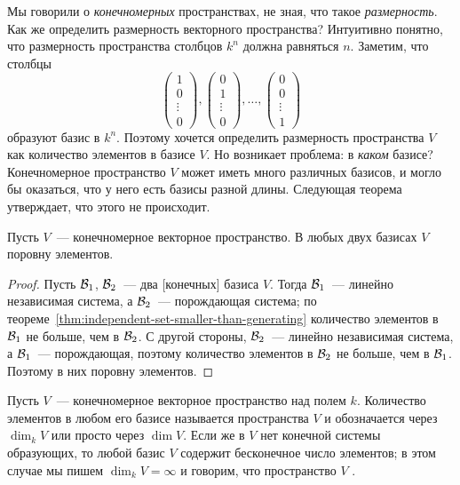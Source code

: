 Мы говорили о {\em конечномерных} пространствах, не зная, что такое
{\em размерность}. Как же определить размерность векторного пространства?
Интуитивно понятно, что размерность пространства столбцов $k^n$ должна равняться $n$.
Заметим, что столбцы
$$
\begin{pmatrix}
1 \\ 0 \\ \vdots \\ 0
\end{pmatrix},
\begin{pmatrix}
0 \\ 1 \\ \vdots \\ 0
\end{pmatrix},\dots,
\begin{pmatrix}
0 \\ 0 \\ \vdots \\ 1
\end{pmatrix}
$$
образуют базис в $k^n$. Поэтому хочется определить размерность пространства $V$
как количество элементов в базисе $V$. Но возникает проблема: в {\em каком} базисе?
Конечномерное пространство $V$ может иметь много различных базисов,
и могло бы оказаться, что у него есть базисы разной длины.
Следующая теорема утверждает, что этого не происходит.

\begin{theorem}\label{thm:bases-have-equal-cardinality}
Пусть $V$~--- конечномерное векторное пространство. В любых двух
базисах $V$ поровну элементов.
\end{theorem}
\begin{proof}
Пусть $\mathcal B_1$, $\mathcal B_2$~--- два [конечных] базиса $V$.
Тогда $\mathcal B_1$~--- линейно независимая система, а $\mathcal B_2$~--- порождающая
система; по теореме~\ref{thm:independent-set-smaller-than-generating}
количество элементов в $\mathcal B_1$ не больше, чем в $\mathcal B_2$.
С другой стороны, $\mathcal B_2$~--- линейно независимая система,
а $\mathcal B_1$~--- порождающая, поэтому количество элементов
в $\mathcal B_2$ не больше, чем в $\mathcal B_1$. Поэтому в них поровну элементов.
\end{proof}

\begin{definition}
Пусть $V$~--- конечномерное векторное пространство над полем
$k$. Количество элементов в любом его базисе называется
 пространства $V$ и обозначается
через
$\dim_kV$ или просто через $\dim V$. Если же в $V$ нет конечной
системы образующих, то любой 
базис $V$ содержит бесконечное число элементов; в этом случае мы пишем 
$\dim_kV=\infty$ и говорим, что пространство $V$
.
\end{definition}

